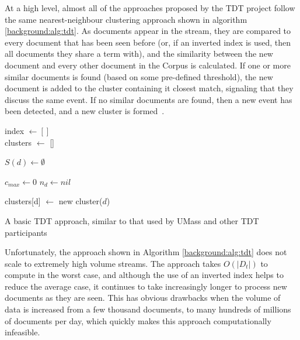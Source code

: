 At a high level, almost all of the approaches proposed by the TDT project follow the same nearest-neighbour clustering approach shown in algorithm \ref{background:alg:tdt}.
As documents appear in the stream, they are compared to every document that has been seen before (or, if an inverted index is used, then all documents they share a term with), and the similarity between the new document and every other document in the Corpus is calculated.
If one or more similar documents is found (based on some pre-defined threshold), the new document is added to the cluster containing it closest match, signaling that they discuss the same event.
If no similar documents are found, then a new event has been detected, and a new cluster is formed~\citep{Allan:2000:FSD:354756.354843}.

\begin{algorithm}
	\DontPrintSemicolon
	index $\gets []$ \\
	clusters $\gets$ [] \\

	 {
		$S(d) \gets \emptyset$ 


		$c_{max} \gets 0$ 
		$n_{d} \gets nil$ 

		 {
			clusters[d] $\gets$ new cluster($d$) 
		}

	}
	\caption{A basic TDT approach, similar to that used by UMass and other TDT participants}
	\label{background:alg:tdt}
\end{algorithm}

Unfortunately, the approach shown in Algorithm \ref{background:alg:tdt} does not scale to extremely high volume streams.
The approach takes $O(|D_t|)$ to compute in the worst case, and although the use of an inverted index helps to reduce the average case, it continues to take increasingly longer to process new documents as they are seen.
This has obvious drawbacks when the volume of data is increased from a few thousand documents, to many hundreds of millions of documents per day, which quickly makes this approach computationally infeasible.

